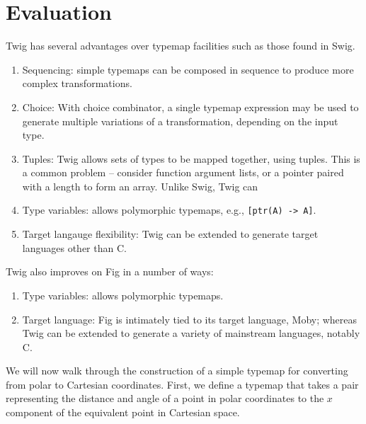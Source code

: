 
\section{Evaluation}

Twig has several advantages over typemap facilities such as those found in Swig.

\begin{enumerate}

\item Sequencing: simple typemaps can be composed in sequence to produce more complex transformations.

\item Choice: With choice combinator, a single typemap expression may be used to generate multiple variations of a transformation, depending on the input type.

\item Tuples: Twig allows sets of types to be mapped together, using tuples. This is a common problem -- consider function argument lists, or a pointer paired with a length to form an array. Unlike Swig, Twig can 

\item Type variables: allows polymorphic typemaps, e.g., \texttt{[ptr(A) -> A]}.
  
\item Target langauge flexibility: Twig can be extended to generate target languages other than C.

\end{enumerate}

Twig also improves on Fig in a number of ways:

\begin{enumerate}

\item Type variables: allows polymorphic typemaps.

\item Target language: Fig is intimately tied to its target language, Moby; whereas Twig can be extended to generate a variety of mainstream languages, notably C.

\end{enumerate}

We will now walk through the construction of a simple typemap for converting from polar to Cartesian coordinates. First, we define a typemap that takes a pair representing the distance and angle of a point in polar coordinates to the $x$ component of the equivalent point in Cartesian space.

